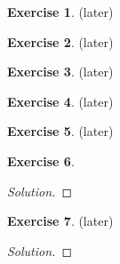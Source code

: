 \documentclass[12pt,a4]{article}
\theoremstyle{definition}
\newtheorem{exercise}{Exercise}
\begin{document}
\begin{exercise}
	(later) 
\end{exercise}

\begin{exercise}
	(later) 
\end{exercise}

\begin{exercise}
	(later) 
\end{exercise}

\begin{exercise}
	(later) 
\end{exercise}

\begin{exercise}
	(later) 
\end{exercise}

\begin{exercise}
	
\end{exercise}
\begin{proof}[Solution]
	
\end{proof}

\begin{exercise}
	(later) 
\end{exercise}
\begin{proof}[Solution]
	
\end{proof}
\end{document}
